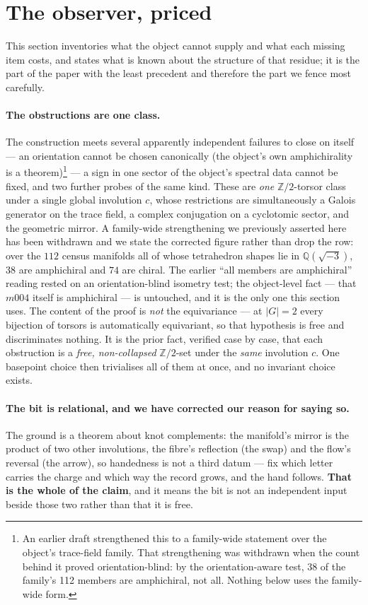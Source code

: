 \documentclass[11pt,a4paper]{article}
\theoremstyle{definition}
\theoremstyle{remark}
\newcommand{\Q}{\mathbb{Q}}
\newcommand{\Z}{\mathbb{Z}}
\begin{document}
\section{The observer, priced}\label{sec:observer}

This section inventories what the object cannot supply and what each missing item costs, and states what is known
about the structure of that residue; it is the part of the paper with the least precedent and therefore the part we
fence most carefully.

\paragraph{The obstructions are one class.} The construction meets several apparently independent
failures to close on itself --- an orientation cannot be chosen canonically (the object's own amphichirality is a
theorem)\footnote{An earlier draft strengthened this to a family-wide statement over the object's trace-field family.
That strengthening was withdrawn when the count behind it proved orientation-blind: by the orientation-aware test,
38 of the family's 112 members are amphichiral, not all. Nothing below uses the family-wide form.} --- a sign in one sector of the object's spectral data cannot be fixed, and two further probes of the same kind. These are \emph{one} $\Z/2$-torsor class
under a single global involution $c$, whose restrictions are simultaneously a Galois generator on the
trace field, a complex conjugation on a cyclotomic sector, and the geometric mirror. A family-wide
strengthening we previously asserted here has been withdrawn and we state the corrected figure rather
than drop the row: over the $112$ census manifolds all of whose tetrahedron shapes lie in
$\Q(\sqrt{-3})$, $38$ are amphichiral and $74$ are chiral. The earlier ``all members are amphichiral''
reading rested on an orientation-blind isometry test; the object-level fact --- that $m004$ itself is
amphichiral --- is untouched, and it is the only one this section uses. The content of the proof is
\emph{not} the equivariance --- at $|G| = 2$ every bijection of torsors is automatically equivariant,
so that hypothesis is free and discriminates nothing. It is the prior fact, verified case by case,
that each obstruction is a \emph{free, non-collapsed} $\Z/2$-set under the \emph{same} involution
$c$. One basepoint choice then trivialises all of them at once, and no invariant choice exists.

\paragraph{The bit is relational, and we have corrected our reason for saying so.} The ground is a
theorem about knot complements: the manifold's mirror is the product of two other involutions, the fibre's
reflection (the swap) and the flow's reversal (the arrow), so handedness is not a third datum --- fix which letter
carries the charge and which way the record grows, and the hand follows. \textbf{That is the whole of the claim},
and it means the bit is not an independent input beside those two rather than that it is free.
\end{document}

